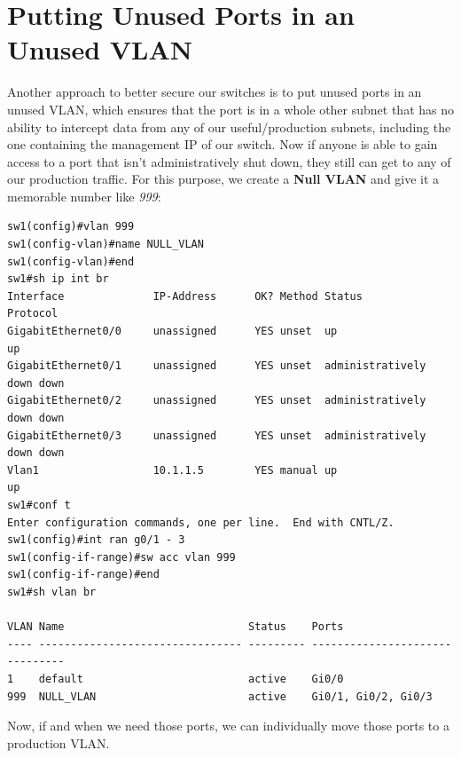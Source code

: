 \section{Putting Unused Ports in an Unused VLAN}
Another approach to better secure our switches is to put unused ports in an unused VLAN, which ensures that the port is in a whole other subnet that has no ability to intercept data from any of our useful/production subnets, including the one containing the management IP of our switch. Now if anyone is able to gain access to a port that isn't administratively shut down, they still can get to any of our production traffic. For this purpose, we create a \textbf{Null VLAN} and give it a memorable number like \textit{999}:

\vspace{-15pt}
\begin{verbatim}
sw1(config)#vlan 999
sw1(config-vlan)#name NULL_VLAN
sw1(config-vlan)#end
sw1#sh ip int br
Interface              IP-Address      OK? Method Status                Protocol
GigabitEthernet0/0     unassigned      YES unset  up                    up
GigabitEthernet0/1     unassigned      YES unset  administratively down down
GigabitEthernet0/2     unassigned      YES unset  administratively down down
GigabitEthernet0/3     unassigned      YES unset  administratively down down
Vlan1                  10.1.1.5        YES manual up                    up
sw1#conf t
Enter configuration commands, one per line.  End with CNTL/Z.
sw1(config)#int ran g0/1 - 3
sw1(config-if-range)#sw acc vlan 999
sw1(config-if-range)#end
sw1#sh vlan br

VLAN Name                             Status    Ports
---- -------------------------------- --------- -------------------------------
1    default                          active    Gi0/0
999  NULL_VLAN                        active    Gi0/1, Gi0/2, Gi0/3
\end{verbatim}
\vspace{-10pt}

\noindent
Now, if and when we need those ports, we can individually move those ports to a production VLAN. 